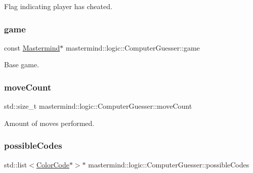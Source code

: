 Flag indicating player has cheated. 

\hypertarget{classmastermind_1_1logic_1_1_computer_guesser_a2f061369ee7e4e0319093a182fc41065}{}\label{classmastermind_1_1logic_1_1_computer_guesser_a2f061369ee7e4e0319093a182fc41065} 
\subsubsection{\texorpdfstring{game}{game}}
{\footnotesize\ttfamily const \hyperlink{classmastermind_1_1logic_1_1_mastermind}{Mastermind}$\ast$ mastermind\+::logic\+::\+Computer\+Guesser\+::game\hspace{0.3cm}{\ttfamily [private]}}



Base game. 

\hypertarget{classmastermind_1_1logic_1_1_computer_guesser_a76f33b29e742132ea800947b2ec0347a}{}\label{classmastermind_1_1logic_1_1_computer_guesser_a76f33b29e742132ea800947b2ec0347a} 
\subsubsection{\texorpdfstring{move\+Count}{moveCount}}
{\footnotesize\ttfamily std\+::size\+\_\+t mastermind\+::logic\+::\+Computer\+Guesser\+::move\+Count\hspace{0.3cm}{\ttfamily [private]}}



Amount of moves performed. 

\hypertarget{classmastermind_1_1logic_1_1_computer_guesser_af2500a37b694f1b2cb8f3242c618def4}{}\label{classmastermind_1_1logic_1_1_computer_guesser_af2500a37b694f1b2cb8f3242c618def4} 
\subsubsection{\texorpdfstring{possible\+Codes}{possibleCodes}}
{\footnotesize\ttfamily std\+::list$<$\hyperlink{classmastermind_1_1logic_1_1_color_code}{Color\+Code}$\ast$$>$$\ast$ mastermind\+::logic\+::\+Computer\+Guesser\+::possible\+Codes\hspace{0.3cm}{\ttfamily [private]}}



